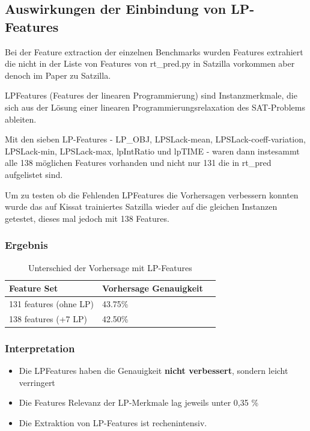 \newpage

\subsection{Auswirkungen der Einbindung von LP-Features}

Bei der Feature extraction der einzelnen Benchmarks wurden Features extrahiert 
die nicht in der Liste von Features von rt\_pred.py in Satzilla vorkommen aber denoch im Paper zu Satzilla.\cite{shavit2024revisiting}

LP\-Features (Features der linearen Programmierung) sind Instanzmerkmale, die sich aus der Lösung einer 
linearen Programmierungsrelaxation des SAT-Problems ableiten.

Mit den sieben LP-Features - LP\_OBJ, LPSLack-mean, LPSLack-coeff-variation, LPSLack-min, LPSLack-max, lpIntRatio und lpTIME - waren 
dann instesammt alle 138 möglichen Features vorhanden und nicht nur 131 die in rt\_pred aufgelistet sind. \cite{shavit2024satzilla}

Um zu testen ob die Fehlenden LP\-Features die Vorhersagen verbessern konnten wurde das auf Kissat
trainiertes Satzilla wieder auf die gleichen Instanzen getestet, dieses mal jedoch mit 138 Features.

\subsubsection{Ergebnis}

\begin{table}[H]
    \centering
    \begin{tabular}{p{}p{}p{}}
        \textbf{Feature Set} & \textbf{Vorhersage Genauigkeit} \\
        \toprule
        131 features (ohne LP) & 43.75\% \\
        \midrule
        138 features (+7 LP) & 42.50\% \\
        \bottomrule
    \end{tabular}
    \caption{Unterschied der Vorhersage mit LP-Features}\label{tab:lp_features}
\end{table}

\subsubsection{Interpretation}

\begin{itemize}
    \setlength{\itemsep}{0pt}
    \setlength{\parskip}{0pt}
    \setlength{\parsep}{0pt}
    \item Die LP\-Features haben die Genauigkeit \textbf{nicht verbessert}, sondern leicht verringert
    \item Die Features Relevanz der LP-Merkmale lag jeweils unter 0,35 \%
    \item Die Extraktion von LP-Features ist rechenintensiv.
\end{itemize}

